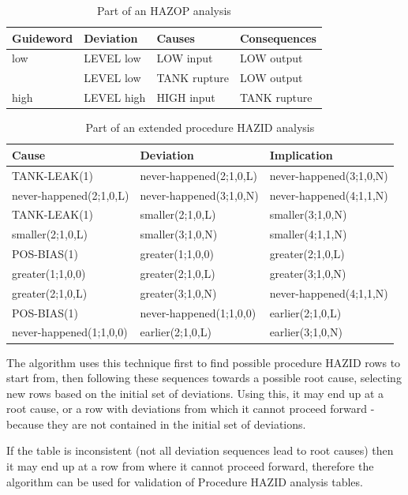\documentclass[conference]{IEEEtran}
\begin{document}
\begin{table}
\label{tab:ehazop}
\caption{Part of an HAZOP analysis}
\begin{tabular}{|l|l|l|l|}
\hline
Guideword & Deviation & Causes & Consequences \\
\hline
\hline
low & LEVEL low & LOW input & LOW output \\
& LEVEL low & TANK rupture & LOW output \\
\hline
high & LEVEL high & HIGH input & TANK rupture \\
\hline
\end{tabular}
\end{table}

\begin{table}
\centering
\label{tab:eprochazid}
\caption{Part of an extended procedure HAZID analysis}
\begin{tabular}{|l|l|l|}
\hline
Cause & Deviation & Implication \\
\hline
\hline
TANK-LEAK(1) & never-happened(2;1,0,L) & never-happened(3;1,0,N) \\
\hline
never-happened(2;1,0,L) & never-happened(3;1,0,N) & never-happened(4;1,1,N) \\
\hline
TANK-LEAK(1) & smaller(2;1,0,L) & smaller(3;1,0,N) \\
\hline
smaller(2;1,0,L) & smaller(3;1,0,N) & smaller(4;1,1,N) \\
\hline
POS-BIAS(1) & greater(1;1,0,0) & greater(2;1,0,L) \\
\hline
greater(1;1,0,0) & greater(2;1,0,L) & greater(3;1,0,N) \\
\hline
greater(2;1,0,L) & greater(3;1,0,N) & never-happened(4;1,1,N) \\
\hline
POS-BIAS(1) & never-happened(1;1,0,0) & earlier(2;1,0,L) \\
\hline
never-happened(1;1,0,0) & earlier(2;1,0,L) & earlier(3;1,0,N) \\
\hline
\end{tabular}
\end{table}


The algorithm uses this technique first to find possible procedure HAZID rows to start from, then following these sequences towards a possible root cause, selecting new rows based on the initial set of deviations. Using this, it may end up at a root cause, or a row with deviations from which it cannot proceed forward - because they are not contained in the initial set of deviations. 

If the table is inconsistent (not all deviation sequences lead to root causes) then it may end up at a row from where it cannot proceed forward, therefore the algorithm can be used for validation of Procedure HAZID analysis tables.
\end{document}
